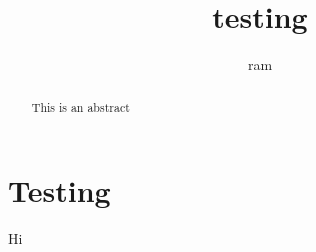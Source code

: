\documentclass[]{article}
\title{testing}
\author{ram}
\begin{document}
\maketitle

\begin{abstract}
This is an abstract
\end{abstract}

\section{Testing}
Hi
\end{document}
